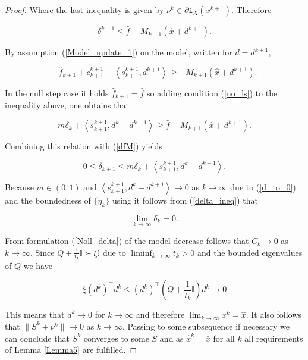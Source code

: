 \begin{proof}
Where the last inequality is given by \(\nu^k \in \partial\mathtt{i}_{X}(x^{k+1})\). Therefore 

\begin{equation}
	\delta^{k+1} \leq \hat{f}-M_{k+1}(\hat{x}+d^{k+1}).
	\label{dfM}
\end{equation}

By assumption (\ref{Model_update_1}) on the model, written for \(d=d^{k+1}\),

\begin{equation*}
	-\hat{f}_{k+1}+c^{k+1}_{k+1}-\left\langle s^{k+1}_{k+1},d^{k+1}\right\rangle \geq -M_{k+1}(\hat{x}+d^{k+1}).
\end{equation*}

In the null step case it holds \(\hat{f}_{k+1}=\hat{f}\) so adding condition (\ref{no_ls}) to the inequality above, one obtains that

\begin{equation*}
	m\delta_k+\left\langle s^{k+1}_{k+1},d^k-d^{k+1}\right\rangle \geq \hat{f}-M_{k+1}(\hat{x}+d^{k+1}).
\end{equation*}

Combining this relation with (\ref{dfM}) yields

\begin{equation*}
	0 \leq \delta_{k+1} \leq m\delta_k + \left\langle s^{k+1}_{k+1},d^k-d^{k+1}\right\rangle.
	\label{delta_ineq}
\end{equation*}

Because \(m \in (0,1)\) and \(\left\langle s^{k+1}_{k+1},d^k-d^{k+1}\right\rangle \to 0\) as \(k \to \infty\) due to (\ref{d_to_0}) and the boundedness of \(\{\eta_k\}\) using \cite[Lemma 3, p.45]{Polyak1987} it follows from  (\ref{delta_ineq}) that 

\begin{equation*}
	\lim_{k \to \infty} \delta_k = 0.
\end{equation*}

From  formulation (\ref{Noll_delta}) of the model decrease follows that \(C_k \to 0\) as \(k \to \infty\). Since {\(Q+\frac{1}{t_k}\mathbb{I} \succ \xi\mathbb{I}\)} due to \(\liminf_{k \to \infty} t_k > 0\) and the bounded eigenvalues of \(Q\) we have 

\begin{equation*}
	\xi \left(d^k\right)^{\top}d^k \leq \left(d^k\right)^{\top}\left(Q+\frac{1}{t_k}\mathbb{I}\right)d^k \to 0
\end{equation*}

This means that \(d^k \to 0\) for \(k \to \infty\) and therefore \(\lim_{k \to \infty}x^k = \hat{x}\). It also follows that \(\|S^k+\nu^k\| \to 0\) as \(k \to \infty\). Passing to some subsequence if necessary we can conclude that \(S^k\) converges to some \(\bar{S}\) and as \(\hat{x}^k = \bar{x}\) for all \(k\) all requirements of Lemma \ref{Lemma5} are fulfilled.

\end{proof}

